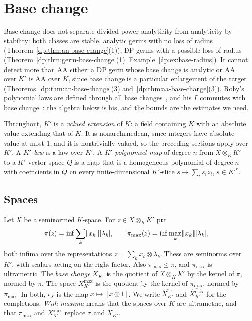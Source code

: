 \section{Base change}\label{dp:sec:base-change}

Base change does not separate divided-power analyticity from analyticity by stability: both classes are stable, analytic germs with no loss of radius (Theorem~\ref{dp:thm:an-base-change}(1)), DP germs with a possible loss of radius (Theorem~\ref{dp:thm:germ-base-change}(1), Example~\ref{dp:ex:base-radius}). It cannot detect more than AA either: a DP germ whose base change is analytic or AA over $K'$ is AA over $K$, since base change is a particular enlargement of the target (Theorems~\ref{dp:thm:an-base-change}(3) and~\ref{dp:thm:aa-base-change}(3)). Roby's polynomial laws are defined through all base changes~\cite[pp.~219--220]{Ro}, and his $\Gamma$ commutes with base change~\cite[Th.~III.3]{Ro}: the algebra below is his, and the bounds are the estimates we need.

Throughout, $K'$ is a \emph{valued extension} of $K$: a field containing $K$ with an absolute value extending that of $K$. It is nonarchimedean, since integers have absolute value at most $1$, and it is nontrivially valued, so the preceding sections apply over $K'$. A \emph{$K'$-law} is a law over $K'$. A \emph{$K'$-polynomial map} of degree $n$ from $X\otimes_KK'$ to a $K'$-vector space $Q$ is a map that is a homogeneous polynomial of degree $n$ with coefficients in $Q$ on every finite-dimensional $K'$-slice $s\mapsto\sum_is_iz_i$, $s\in K'^r$.

\subsection{Spaces}

\begin{definition}\label{dp:def:base-change}
Let $X$ be a seminormed $K$-space. For $z\in X\otimes_KK'$ put
\[
 \pi(z)=\inf\sum_k\lVert x_k\rVert\lvert \lambda_k\rvert,\qquad\pi_{\max}(z)=\inf\max_k\lVert x_k\rVert\lvert \lambda_k\rvert,
\]
both infima over the representations $z=\sum_kx_k\otimes\lambda_k$. These are seminorms over $K'$, with scalars acting on the right factor. Also $\pi_{\max}\le\pi$, and $\pi_{\max}$ is ultrametric. The \emph{base change} $X_{K'}$ is the quotient of $X\otimes_KK'$ by the kernel of $\pi$, normed by $\pi$. The space $X^{\max}_{K'}$ is the quotient by the kernel of $\pi_{\max}$, normed by $\pi_{\max}$. In both, $\iota_X$ is the map $x\mapsto[x\otimes1]$. We write $\widehat{X_{K'}}$ and $\widehat{X^{\max}_{K'}}$ for the completions. \emph{With maxima} means that the spaces over $K$ are ultrametric, and that $\pi_{\max}$ and $X^{\max}_{K'}$ replace $\pi$ and $X_{K'}$.
\end{definition}

